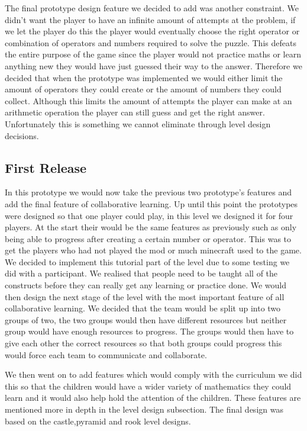 The final prototype design feature we decided to add was another constraint. We didn’t want the player to have an infinite amount of attempts at the problem, if we let the player do this the player would eventually choose the right operator or combination of operators and numbers required to solve the puzzle. This defeats the entire purpose of the game since the player would not practice maths or learn anything new they would have just guessed their way to the answer. Therefore we decided that when the prototype was implemented we would either limit the amount of operators they could create or the amount of numbers they could collect. Although this limits the amount of attempts the player can make at an arithmetic operation the player can still guess and get the right answer. Unfortunately this is something we cannot eliminate through level design decisions.

\subsection{First Release}
In this prototype we would now take the previous two prototype’s features and add the final feature of collaborative learning. Up until this point the prototypes were designed so that one player could play, in this level we designed it for four players. At the start their would be the same features as previously such as only being able to progress after creating a certain number or operator. This was to get the players who had not played the mod or much minecraft used to the game. We decided to implement this tutorial part of the level due to some testing we did with a participant. We realised that people need to be taught all of the constructs before they can really get any learning or practice done. We would then design the next stage of the level with the most important feature of all collaborative learning. We decided that the team would be split up into two groups of two, the two groups would then have different resources but neither group would have enough resources to progress. The groups would then have to give each other the correct resources so that both groups could progress this would force each team to communicate and collaborate. 

We then went on to add features which would comply with the curriculum we did this so that the children would have a wider variety of mathematics they could learn and it would also help hold the attention of the children. These features are mentioned more in depth in the level design subsection. The final design was based on the castle,pyramid and rook level designs.

